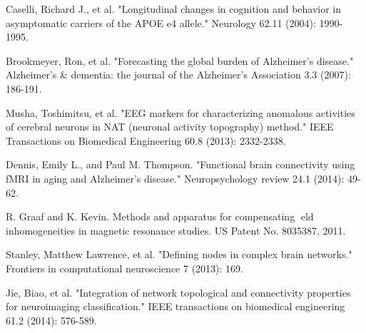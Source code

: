 \documentclass[journal]{IEEEtran}
\begin{document}
	\begin{thebibliography}{1}
		
		Caselli, Richard J., et al. "Longitudinal changes in cognition and behavior in asymptomatic carriers of the APOE e4 allele." Neurology 62.11 (2004): 1990-1995.
		
		Brookmeyer, Ron, et al. "Forecasting the global burden of Alzheimer’s disease." Alzheimer's \& dementia: the journal of the Alzheimer's Association 3.3 (2007): 186-191.
		
		Musha, Toshimitsu, et al. "EEG markers for characterizing anomalous activities of cerebral neurons in NAT (neuronal activity topography) method." IEEE Transactions on Biomedical Engineering 60.8 (2013): 2332-2338.
		
		
		Dennis, Emily L., and Paul M. Thompson. "Functional brain connectivity using fMRI in aging and Alzheimer’s disease." Neuropsychology review 24.1 (2014): 49-62.
		
		
		
		R. Graaf and K. Kevin. Methods and apparatus for
		compensating eld inhomogeneities in magnetic resonance
		studies. US Patent No. 8035387, 2011.
		
		
		Stanley, Matthew Lawrence, et al. "Defining nodes in complex brain networks." Frontiers in computational neuroscience 7 (2013): 169.
		
		Jie, Biao, et al. "Integration of network topological and connectivity properties for neuroimaging classification." IEEE transactions on biomedical engineering 61.2 (2014): 576-589.
		

\end{thebibliography}
\end{document}
